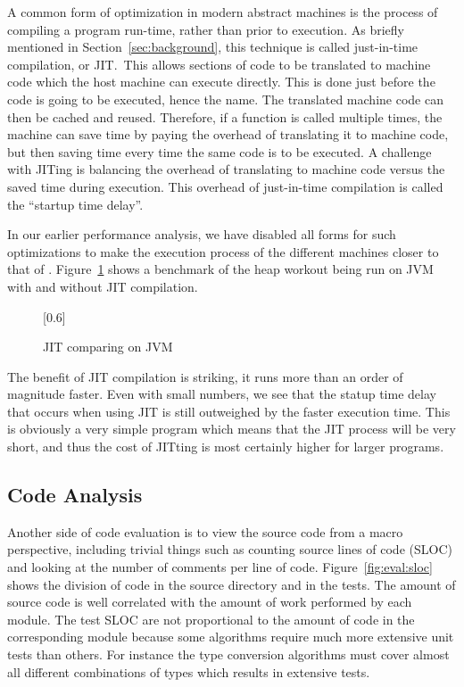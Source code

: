
A common form of optimization in modern abstract machines is the process of
compiling a program run-time, rather than prior to execution. As briefly
mentioned in Section~\ref{sec:background}, this technique is called just-in-time
compilation, or JIT.~This allows sections of code to be translated to machine
code which the host machine can execute directly. This is done just before the
code is going to be executed, hence the name. The translated machine code can
then be cached and reused. Therefore, if a function is called multiple times,
the machine can save time by paying the overhead of translating it to machine
code, but then saving time every time the same code is to be executed. A
challenge with JITing is balancing the overhead of translating to machine code
versus the saved time during execution. This overhead of just-in-time
compilation is called the ``startup time delay''.

In our earlier performance analysis, we have disabled all forms for such
optimizations to make the execution process of the different machines closer to
that of \thename{}. Figure~\ref{fig:eval:benchmark:jit} shows a benchmark of the
heap workout being run on JVM with and without JIT compilation.

\begin{figure}[H]
  \centering
  \scalebox{0.8}[0.6]{}
  \caption{JIT comparing on JVM}
\label{fig:eval:benchmark:jit}
\end{figure}

The benefit of JIT compilation is striking, it runs more than an order of
magnitude faster. Even with small numbers, we see that the statup time delay
that occurs when using JIT is still outweighed by the faster execution
time. This is obviously a very simple program which means that the JIT process
will be very short, and thus the cost of JITting is most certainly higher for
larger programs.

\subsection{Code Analysis}

Another side of code evaluation is to view the source code from a macro
perspective, including trivial things such as counting source lines of code
(SLOC) and looking at the number of comments per line of
code. Figure~\ref{fig:eval:sloc} shows the division of code in the source
directory and in the tests. The amount of source code is well correlated with
the amount of work performed by each module. The test SLOC are not proportional
to the amount of code in the corresponding module because some algorithms
require much more extensive unit tests than others. For instance the type
conversion algorithms must cover almost all different combinations of types
which results in extensive tests.

